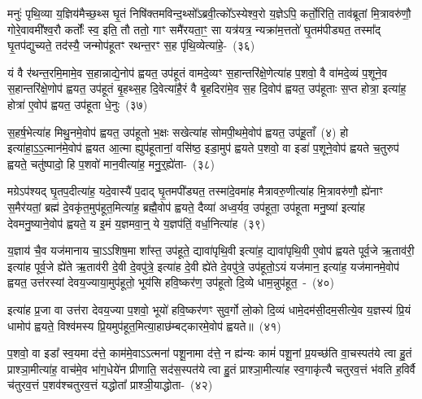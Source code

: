 मनुः॑ पृथि॒व्या य॒ज्ञिय॑मैच्छ॒थ्स घृ॒तं निषि॑क्तमविन्द॒थ्सो᳚\-ऽब्रवी॒त्को᳚\-ऽस्येश्व॒रो य॒ज्ञे\-ऽपि॒ कर्तो॒रिति॒ ताव॑ब्रूतां मि॒त्रावरु॑णौ॒ गोरे॒वावमी᳚श्व॒रौ कर्तोः᳚ स्व॒ इति॒ तौ ततो॒ गाꣳ समै॑रयता॒ꣳ॒ सा यत्र॑यत्र॒ न्यक्रा॑म॒त्ततो॑ घृ॒तम॑पीड्यत॒ तस्मा᳚द् घृ॒तप॑द्युच्यते॒ तद॑स्यै॒ जन्मोप॑हूतꣳ रथन्त॒रꣳ स॒ह पृ॑थि॒व्येत्या॑हे॒-~(३६)\ip

यं वै र॑थन्त॒रमि॒मामे॒व स॒हान्नाद्ये॒नोप॑ ह्वयत॒ उप॑हूतं वामदे॒व्यꣳ स॒हान्तरि॑क्षे॒णेत्या॑ह प॒शवो॒ वै वा॑मदे॒व्यं प॒शूने॒व स॒हान्तरि॑क्षे॒णोप॑ ह्वयत॒ उप॑हूतं बृ॒हथ्स॒ह दि॒वेत्या॑है॒रं वै बृ॒हदिरा॑मे॒व स॒ह दि॒वोप॑ ह्वयत॒ उप॑हूताः स॒प्त होत्रा॒ इत्या॑ह॒ होत्रा॑ ए॒वोप॑ ह्वयत॒ उप॑हूता धे॒नुः~(३७)\ip

स॒हर्\mbox{}ष॒भेत्या॑ह मिथु॒नमे॒वोप॑ ह्वयत॒ उप॑हूतो भ॒क्षः सखेत्या॑ह सोमपी॒थमे॒वोप॑ ह्वयत॒ उप॑हू॒ताँ~(४) हो इत्या॑हा॒\-ऽ॒\-ऽ॒त्मान॑मे॒वोप॑ ह्वयत आ॒त्मा ह्युप॑हूतानां॒ वसि॑ष्ठ॒ इडा॒मुप॑ ह्वयते प॒शवो॒ वा इडा॑ प॒शूने॒वोप॑ ह्वयते च॒तुरुप॑ ह्वयते॒ चतु॑ष्पादो॒ हि प॒शवो॑ मान॒वीत्या॑ह॒ मनु॒र्॒\mbox{}ह्ये॑ता-~(३८)\ip

मग्रे\-ऽप॑श्यद् घृ॒तप॒दीत्या॑ह॒ यदे॒वास्यै॑ प॒दाद् घृ॒तमपी᳚ड्यत॒ तस्मा॑दे॒वमा॑ह मैत्रावरु॒णीत्या॑ह मि॒त्रावरु॑णौ॒ ह्ये॑नाꣳ स॒मैर॑यतां॒ ब्रह्म॑ दे॒वकृ॑त॒मुप॑हूत॒मित्या॑ह॒ ब्रह्मै॒वोप॑ ह्वयते॒ दैव्या॑ अध्व॒र्यव॒ उप॑हूता॒ उप॑हूता मनु॒ष्या॑ इत्या॑ह देवमनु॒ष्याने॒वोप॑ ह्वयते॒ य इ॒मं य॒ज्ञमवा॒न्॒ ये य॒ज्ञप॑तिं॒ वर्धा॒नित्या॑ह~(३९)\ip

य॒ज्ञाय॑ चै॒व यज॑मानाय चा॒\-ऽऽ\-शिष॒मा शा᳚स्त॒ उप॑हूते॒ द्यावा॑\-पृथि॒वी इत्या॑ह॒ द्यावा॑\-पृथि॒वी ए॒वोप॑ ह्वयते पूर्व॒जे ऋ॒ताव॑री॒ इत्या॑ह पूर्व॒जे ह्ये॑ते ऋ॒ताव॑री दे॒वी दे॒वपु॑त्रे॒ इत्या॑ह दे॒वी ह्ये॑ते दे॒वपु॑त्रे॒ उप॑हूतो॒\-ऽयं यज॑मान॒ इत्या॑ह॒ यज॑मानमे॒वोप॑ ह्वयत॒ उत्त॑रस्यां देवय॒ज्याया॒मुप॑हूतो॒ भूय॑सि हवि॒ष्कर॑ण॒ उप॑हूतो दि॒व्ये धाम॒न्नुप॑हूत॒~-~(४०)\ip

इत्या॑ह प्र॒जा वा उत्त॑रा देवय॒ज्या प॒शवो॒ भूयो॑ हवि॒ष्कर॑णꣳ सुव॒र्गो लो॒को दि॒व्यं धामे॒दम॑सी॒दम॒सीत्ये॒व य॒ज्ञस्य॑ प्रि॒यं धामोप॑ ह्वयते॒ विश्व॑मस्य प्रि॒यमुप॑हूत॒मित्या॒हाछ॑म्बट्कारमे॒वोप॑ ह्वयते॥~(४१)\ip

{\anuvakamend[{आ॒ह॒ धे॒नुरे॒तां वर्धा॒नित्या॑ह॒ धाम॒न्नुप॑हूत॒श्चतु॑स्त्रिꣳशच्च}]}

प॒शवो॒ वा इडा᳚ स्व॒यमा द॑त्ते॒ काम॑मे॒वा\-ऽऽ\-त्मना॑ पशू॒नामा द॑त्ते॒ न ह्य॑न्यः कामं॑ पशू॒नां प्र॒यच्छ॑ति वा॒चस्पत॑ये त्वा हु॒तं प्राश्ञा॒मीत्या॑ह॒ वाच॑मे॒व भा॑ग॒धेये॑न प्रीणाति॒ सद॑स॒स्पत॑ये त्वा हु॒तं प्राश्ञा॒मीत्या॑ह स्व॒गाकृ॑त्यै चतुरव॒त्तं भ॑वति ह॒विर्वै च॑तुरव॒त्तं प॒शव॑श्चतुरव॒त्तं यद्धोता᳚ प्राश्ञी॒याद्धोता-~(४२)\ip

